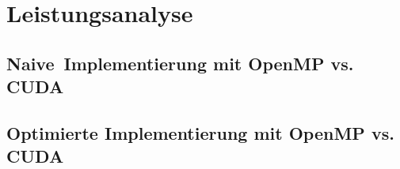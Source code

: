 \chapter{Leistungsanalyse}

\section{\glqq Naive\grqq\ Implementierung mit OpenMP vs. CUDA}

\section{\glqq Optimierte Implementierung mit OpenMP vs. CUDA}

